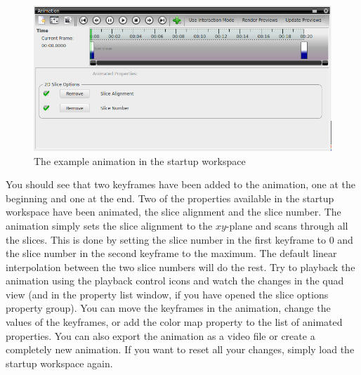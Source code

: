 \begin{figure}[htb]
 \centering
 \includegraphics[scale=0.5,keepaspectratio=true]{./images/startup_animation.png}
 \caption{The example animation in the startup workspace}
 \label{fig:startup_animation}
\end{figure}

You should see that two keyframes have been added to the animation, one at the beginning and one at the end. Two of the properties
available in the startup workspace have been animated, the slice alignment and the slice number. The animation simply sets the slice 
alignment to the $xy$-plane and scans through all the slices. This is done by setting the slice number in the first keyframe to $0$ 
and the slice number in the second keyframe to the maximum. The default linear interpolation between the two slice numbers will do the rest.
Try to playback the animation using the playback control icons and watch the changes in the quad view (and in the property list window,
if you have opened the slice options property group). You can move the keyframes in the animation, change the values of the keyframes,
or add the color map property to the list of animated properties. You can also export the animation as a video file or create a completely
new animation. If you want to reset all your changes, simply load the startup workspace again.


\newpage